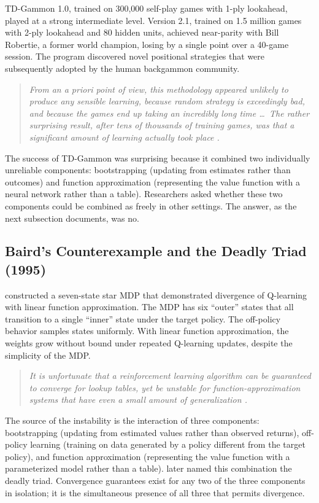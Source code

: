TD-Gammon 1.0, trained on 300{,}000 self-play games with 1-ply lookahead, played at a strong intermediate level. Version 2.1, trained on 1.5 million games with 2-ply lookahead and 80 hidden units, achieved near-parity with Bill Robertie, a former world champion, losing by a single point over a 40-game session. The program discovered novel positional strategies that were subsequently adopted by the human backgammon community.

\begin{quote}\itshape
From an a priori point of view, this methodology appeared unlikely to produce any sensible learning, because random strategy is exceedingly bad, and because the games end up taking an incredibly long time \ldots\ The rather surprising result, after tens of thousands of training games, was that a significant amount of learning actually took place \citep{tesauro1994}.
\end{quote}

The success of TD-Gammon was surprising because it combined two individually unreliable components: bootstrapping (updating from estimates rather than outcomes) and function approximation (representing the value function with a neural network rather than a table). Researchers asked whether these two components could be combined as freely in other settings. The answer, as the next subsection documents, was no.

\subsection{Baird's Counterexample and the Deadly Triad (1995)}

\citet{Baird1995} constructed a seven-state star MDP that demonstrated divergence of Q-learning with linear function approximation. The MDP has six ``outer'' states that all transition to a single ``inner'' state under the target policy. The off-policy behavior samples states uniformly. With linear function approximation, the weights grow without bound under repeated Q-learning updates, despite the simplicity of the MDP.

\begin{quote}\itshape
It is unfortunate that a reinforcement learning algorithm can be guaranteed to converge for lookup tables, yet be unstable for function-approximation systems that have even a small amount of generalization \citep{Baird1995}.
\end{quote}

The source of the instability is the interaction of three components: bootstrapping (updating from estimated values rather than observed returns), off-policy learning (training on data generated by a policy different from the target policy), and function approximation (representing the value function with a parameterized model rather than a table). \citet{sutton2018} later named this combination the deadly triad. Convergence guarantees exist for any two of the three components in isolation; it is the simultaneous presence of all three that permits divergence.

